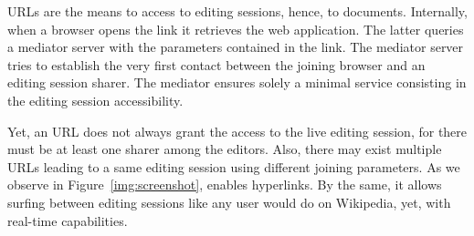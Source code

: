 URLs are the means to access to editing sessions, hence, to
documents. Internally, when a browser opens the link it retrieves the web
application. The latter queries a mediator server with the parameters contained
in the link. The mediator server tries to establish the very first contact
between the joining browser and an editing session sharer.  The mediator ensures
solely a minimal service consisting in the editing session accessibility.

Yet, an URL does not always grant the access to the live editing session, for
there must be at least one sharer among the editors. Also, there may exist
multiple URLs leading to a same editing session using different joining
parameters. As we observe in Figure~\ref{img:screenshot}, \CRATE enables
hyperlinks. By the same, it allows surfing between editing sessions like any
user would do on Wikipedia, yet, with real-time capabilities.
